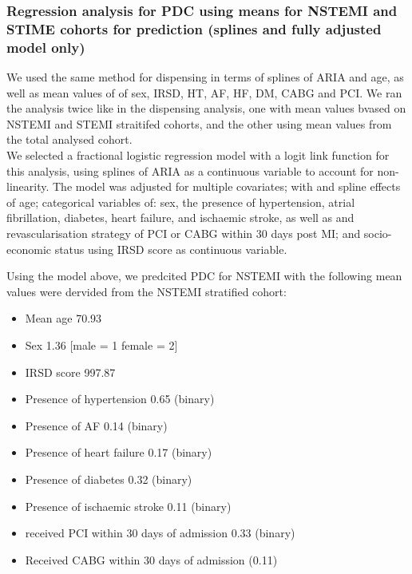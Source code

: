 \documentclass[11pt]{article}
\begin{document}
\subsubsection{Regression analysis for PDC using means for NSTEMI and STIME cohorts for prediction (splines and fully adjusted model only)}
We used the same method for dispensing in terms of splines of ARIA and age, as well as mean values of of sex, IRSD, HT, AF, HF, DM, CABG and PCI. We ran the analysis twice like in the dispensing analysis, one with mean values bvased on NSTEMI and STEMI straitifed cohorts, and the other using mean values from the total analysed cohort. \\
We selected a fractional logistic regression model with a logit link function for this analysis, using splines of ARIA as a continuous variable to account for non-linearity. The model was adjusted for multiple covariates; with and spline effects of age; categorical variables of: sex, the presence of hypertension, atrial fibrillation, diabetes, heart failure, and ischaemic stroke, as well as and revascularisation strategy of PCI or CABG within 30 days post MI; and socio-economic status using IRSD score as continuous variable. \\
\color{violet}
\begin{stlog}\end{stlog}
\color{black}
Using the model above, we predcited PDC for NSTEMI with the following mean values were dervided from the NSTEMI stratified cohort: \\
\begin{itemize}
\item Mean age 70.93
\item Sex 1.36 [male = 1 female = 2]
\item IRSD score 997.87
\item Presence of hypertension 0.65 (binary)
\item Presence of AF 0.14 (binary)
\item Presence of heart failure 0.17 (binary)
\item Presence of diabetes 0.32 (binary)
\item Presence of ischaemic stroke 0.11 (binary)
\item received PCI within 30 days of admission 0.33 (binary)
\item Received CABG within 30 days of admission (0.11)
\end{itemize}
\end{document}
